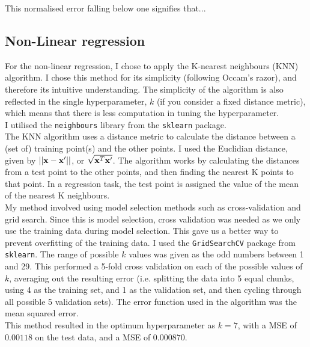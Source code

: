 \documentclass{scrartcl}
\begin{document}
This normalised error falling below one signifies that...

\subsection{Non-Linear regression}

For the non-linear regression, I chose to apply the K-nearest neighbours (KNN) algorithm. I chose this method for its simplicity (following Occam's razor), and therefore its intuitive understanding. The simplicity of the algorithm is also reflected in the single hyperparameter, $k$ (if you consider a fixed distance metric), which means that there is less computation in tuning the hyperparameter. \\

I utilised the \texttt{neighbours} library from the \texttt{sklearn} package. \\

The KNN algorithm uses a distance metric to calculate the distance between a (set of) training point(s) and the other points. I used the Euclidian distance, given by $ || {\mathbf x} - {\mathbf x}' || $, or $ \sqrt {{\mathbf x}^T {\mathbf x}' } $. The algorithm works by calculating the distances from a test point to the other points, and then finding the nearest K points to that point. In a regression task, the test point is assigned the value of the mean of the nearest K neighbours. \\

My method involved using model selection methods such as cross-validation and grid search. Since this is model selection, cross validation was needed as we only use the training data during model selection. This gave us a better way to prevent overfitting of the training data. I used the \texttt{GridSearchCV} package from \texttt{sklearn}. The range of possible $k$ values was given as the odd numbers between 1 and 29. This performed a 5-fold cross validation on each of the possible values of $k$, averaging out the resulting error (i.e. splitting the data into 5 equal chunks, using 4 as the training set, and 1 as the validation set, and then cycling through all possible 5 validation sets). The error function used in the algorithm was the mean squared error.\\

This method resulted in the optimum hyperparameter as $k = 7$, with a MSE of $0.00118$ on the test data, and a MSE of $0.000870$. \\
\end{document}
